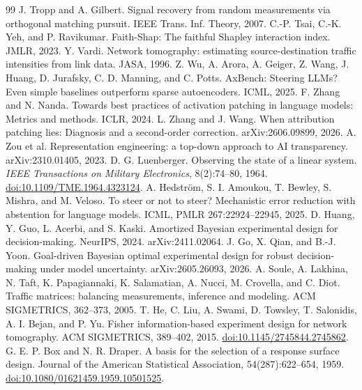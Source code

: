 \documentclass[sigconf,10pt,nonacm,balance=false]{acmart}
\begin{document}
\begin{thebibliography}{99}
 J. Tropp and A. Gilbert. Signal recovery from random measurements via orthogonal matching pursuit. IEEE Trans. Inf. Theory, 2007.
 C.-P. Tsai, C.-K. Yeh, and P. Ravikumar. Faith-Shap: The faithful Shapley interaction index. JMLR, 2023.
 Y. Vardi. Network tomography: estimating source-destination traffic intensities from link data. JASA, 1996.
 Z. Wu, A. Arora, A. Geiger, Z. Wang, J. Huang, D. Jurafsky, C. D. Manning, and C. Potts. AxBench: Steering LLMs? Even simple baselines outperform sparse autoencoders. ICML, 2025.
 F. Zhang and N. Nanda. Towards best practices of activation patching in language models: Metrics and methods. ICLR, 2024.
 L. Zhang and J. Wang. When attribution patching lies: Diagnosis and a second-order correction. arXiv:2606.09899, 2026.
 A. Zou et al. Representation engineering: a top-down approach to AI transparency. arXiv:2310.01405, 2023.
 D. G. Luenberger. Observing the state of a linear system. \emph{IEEE Transactions on Military Electronics}, 8(2):74--80, 1964. \href{https://doi.org/10.1109/TME.1964.4323124}{doi:10.1109/TME.1964.4323124}.
 A. Hedstr{\"o}m, S. I. Amoukou, T. Bewley, S. Mishra, and M. Veloso. To steer or not to steer? Mechanistic error reduction with abstention for language models. ICML, PMLR 267:22924--22945, 2025.
 D. Huang, Y. Guo, L. Acerbi, and S. Kaski. Amortized Bayesian experimental design for decision-making. NeurIPS, 2024. arXiv:2411.02064.
 J. Go, X. Qian, and B.-J. Yoon. Goal-driven Bayesian optimal experimental design for robust decision-making under model uncertainty. arXiv:2605.26093, 2026.
 A. Soule, A. Lakhina, N. Taft, K. Papagiannaki, K. Salamatian, A. Nucci, M. Crovella, and C. Diot. Traffic matrices: balancing measurements, inference and modeling. ACM SIGMETRICS, 362--373, 2005.
 T. He, C. Liu, A. Swami, D. Towsley, T. Salonidis, A. I. Bejan, and P. Yu. Fisher information-based experiment design for network tomography. ACM SIGMETRICS, 389--402, 2015. \href{https://doi.org/10.1145/2745844.2745862}{doi:10.1145/2745844.2745862}.
 G. E. P. Box and N. R. Draper. A basis for the selection of a response surface design. Journal of the American Statistical Association, 54(287):622--654, 1959. \href{https://doi.org/10.1080/01621459.1959.10501525}{doi:10.1080/01621459.1959.10501525}.
\end{thebibliography}
\end{document}
